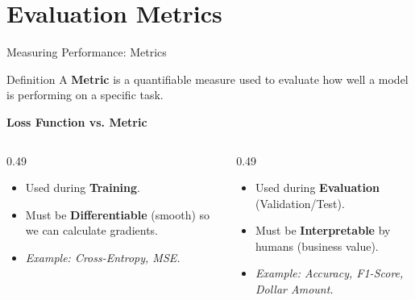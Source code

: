 \section{Evaluation Metrics}
\begin{frame}{Measuring Performance: Metrics}

    \begin{block}{Definition}
        A \textbf{Metric} is a quantifiable measure used to evaluate how well a model is performing on a specific task.
    \end{block}

    
    \textbf{Loss Function vs. Metric}
    \vspace{-1em}
    
    \begin{columns}[T]
        \begin{column}{0.49\textwidth}
            \begin{tcolorbox}[colback=blue!5, colframe=blue!50, title=Loss (For the Machine)]
                \small
                \begin{itemize}
                    \item Used during \textbf{Training}.
                    \item Must be \textbf{Differentiable} (smooth) so we can calculate gradients.
                    \item \textit{Example: Cross-Entropy, MSE.}
                \end{itemize}
            \end{tcolorbox}
        \end{column}
        
        \begin{column}{0.49\textwidth}
            \begin{tcolorbox}[colback=darkred!5, colframe=darkred!90, title=Metric (For the Human)]
                \small
                \begin{itemize}
                    \item Used during \textbf{Evaluation} (Validation/Test).
                    \item Must be \textbf{Interpretable} by humans (business value).
                    \item \textit{Example: Accuracy, F1-Score, Dollar Amount.}
                \end{itemize}
            \end{tcolorbox}
        \end{column}
    \end{columns}
\end{frame}

